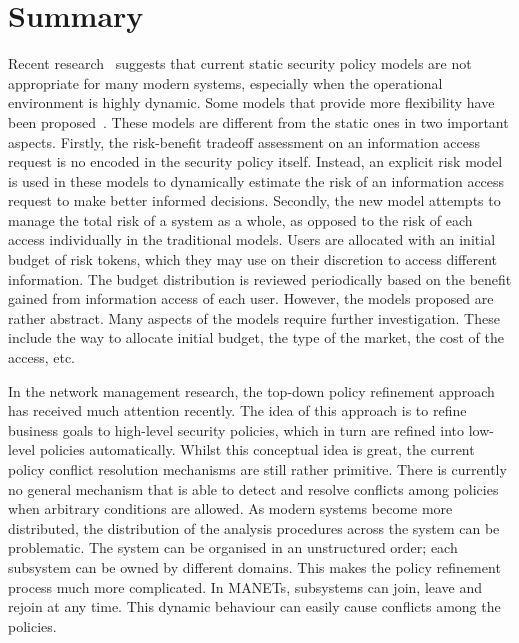 \section{Summary}
\label{Review}
Recent research~\cite{JPO04} suggests that current static security
policy models are not appropriate for many modern systems, especially
when the operational environment is highly dynamic. Some models that
provide more flexibility have been
proposed~\cite{PCC07,PCC07A,JPO04}. These models are different from
the static ones in two important aspects. Firstly, the risk-benefit
tradeoff assessment on an information access request is no encoded in
the security policy itself. Instead, an explicit risk model is used in
these models to dynamically estimate the risk of an information access
request to make better informed decisions. Secondly, the new model
attempts to manage the total risk of a system as a whole, as opposed
to the risk of each access individually in the traditional
models. Users are allocated with an initial budget of risk tokens,
which they may use on their discretion to access different
information. The budget distribution is reviewed periodically based on
the benefit gained from information access of each user. However, the
models proposed are rather abstract. Many aspects of the models
require further investigation. These include the way to allocate
initial budget, the type of the market, the cost of the access, etc.

In the network management research, the top-down policy refinement
approach has received much attention recently. The idea of this
approach is to refine business goals to high-level security policies,
which in turn are refined into low-level policies
automatically. Whilst this conceptual idea is great, the current
policy conflict resolution mechanisms are still rather
primitive. There is currently no general mechanism that is able to
detect and resolve conflicts among policies when arbitrary conditions
are allowed. As modern systems become more distributed, the
distribution of the analysis procedures across the system can be
problematic. The system can be organised in an unstructured order;
each subsystem can be owned by different domains. This makes the
policy refinement process much more complicated.  In MANETs,
subsystems can join, leave and rejoin at any time. This dynamic
behaviour can easily cause conflicts among the policies.

